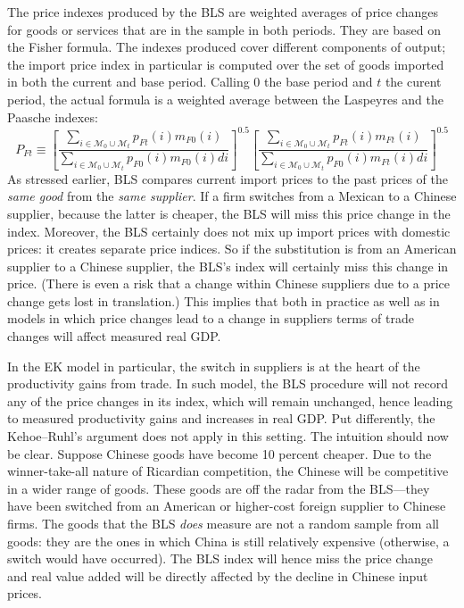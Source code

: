 \documentclass[12pt]{article}
\begin{document}
The price indexes produced by the BLS are weighted averages of price changes
for goods or services that are in the sample in both periods. They are based
on the Fisher formula. The indexes produced cover different components of
output; the import price index in particular is computed over the set of
goods imported in both the current and base period. Calling $0$ the base
period and $t$ the curent period, the actual formula is a weighted average
between the Laspeyres and the Paasche indexes: 
\begin{equation*}
P_{Ft}\equiv \left[ \frac{\sum\limits_{i\in \mathcal{M}_{0}\cup \mathcal{M}%
_{t}}p_{Ft}(i)m_{F0}(i)}{\sum\limits_{i\in \mathcal{M}_{0}\cup \mathcal{M}%
_{t}}p_{F0}(i)m_{F0}(i)di}\right] ^{0.5}\left[ \frac{\sum\limits_{i\in 
\mathcal{M}_{0}\cup \mathcal{M}_{t}}p_{Ft}(i)m_{Ft}(i)}{\sum\limits_{i\in 
\mathcal{M}_{0}\cup \mathcal{M}_{t}}p_{F0}(i)m_{Ft}(i)di}\right] ^{0.5}
\end{equation*}%
As stressed earlier, BLS compares current import prices to the past prices
of the \emph{same good} from the \emph{same supplier}. If a firm switches
from a Mexican to a Chinese supplier, because the latter is cheaper, the BLS
will miss this price change in the index. Moreover, the BLS certainly does
not mix up import prices with domestic prices: it creates separate price
indices. So if the substitution is from an American supplier to a Chinese
supplier, the BLS's index will certainly miss this change in price. (There
is even a risk that a change within Chinese suppliers due to a price change
gets lost in translation.) This implies that both in practice as well as in
models in which price changes lead to a change in suppliers terms of trade
changes will affect measured real GDP.

In the EK model in particular, the switch in suppliers is at the heart of
the productivity gains from trade. In such model, the BLS procedure will not
record any of the price changes in its index, which will remain unchanged,
hence leading to measured productivity gains and increases in real GDP. Put
differently, the Kehoe--Ruhl's argument does not apply in this setting. The
intuition should now be clear. Suppose Chinese goods have become 10 percent
cheaper. Due to the winner-take-all nature of Ricardian competition, the
Chinese will be competitive in a wider range of goods. These goods are off
the radar from the BLS---they have been switched from an American or
higher-cost foreign supplier to Chinese firms. The goods that the BLS \emph{%
does} measure are not a random sample from all goods: they are the ones in
which China is still relatively expensive (otherwise, a switch would have
occurred). The BLS index will hence miss the price change and real value
added will be directly affected by the decline in Chinese input prices.
\end{document}
